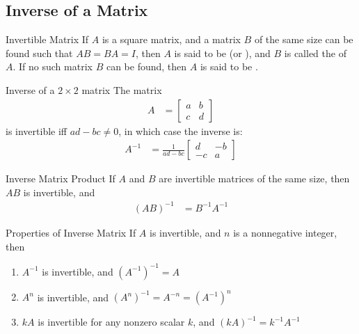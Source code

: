 \documentclass[\main/notes.tex]{subfiles}
\begin{document}
			\subsection{Inverse of a Matrix}
				\begin{definition}{Invertible Matrix}
					If $A$ is a square matrix, and a matrix $B$ of the same size can be found such that $AB = BA = I$, then $A$ is said to be  (or ), and $B$ is called the  of $A$. If no such matrix $B$ can be found, then $A$ is said to be .
				\end{definition}
				\begin{theorem}{Inverse of a $2 \times 2$ matrix}
					The matrix
					\begin{align*}
						A &= \begin{bmatrix}
							a & b\\
							c & d
						\end{bmatrix}
					\end{align*}
					is invertible iff $ad - bc \neq 0$, in which case the inverse is:
					\begin{align*}
						A^{-1} &= \frac{1}{ad-bc}\begin{bmatrix}
							d & -b\\
							-c & a
						\end{bmatrix}
					\end{align*}
				\end{theorem}
				\begin{definition}{Inverse Matrix Product}
					If $A$ and $B$ are invertible matrices of the same size, then $AB$ is invertible, and
					\begin{align*}
						(AB)^{-1} &= B^{-1}A^{-1}
					\end{align*}
				\end{definition}
				\begin{sidenote}{Properties of Inverse Matrix}
					If $A$ is invertible, and $n$ is a nonnegative integer, then
					\begin{enumerate}[label=(\alph*)]
						\item $A^{-1}$ is invertible, and $(A^{-1})^{-1} = A$
						\item $A^{n}$ is invertible, and $(A^{n})^{-1} = A^{-n} = (A^{-1})^{n}$
						\item $kA$ is invertible for any nonzero scalar $k$, and $(kA)^{-1} = k^{-1}A^{-1}$
					\end{enumerate}
				\end{sidenote}
\end{document}
